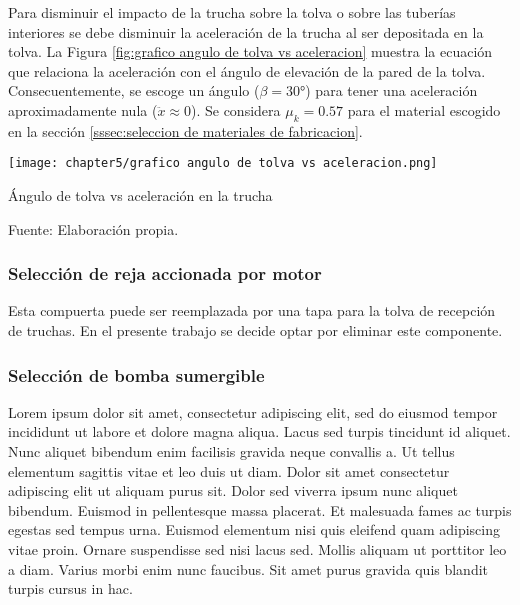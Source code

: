 Para disminuir el impacto de la trucha sobre la tolva o sobre las tuberías interiores se debe disminuir la aceleración de la trucha al ser depositada en la tolva. La Figura \ref{fig:grafico angulo de tolva vs aceleracion} muestra la ecuación que relaciona la aceleración con el ángulo de elevación de la pared de la tolva. Consecuentemente, se escoge un ángulo ($\beta=30°$) para tener una aceleración aproximadamente nula ($\ddot{x}\approx0$). Se considera $\mu_{k}=0.57$ para el material escogido en la sección \ref{sssec:seleccion de materiales de fabricacion}.


\begin{myfigure}[H]
	\centering
	\texttt{[image: chapter5/grafico angulo de tolva vs aceleracion.png]}
	\caption{Ángulo de tolva vs aceleración en la trucha}
	\begin{myflushleftportland}
		Fuente: Elaboración propia.
	\end{myflushleftportland}
	\label{fig:grafico angulo de tolva vs aceleracion}
\end{myfigure}

\subsubsection{Selección de reja accionada por motor}

Esta compuerta puede ser reemplazada por una tapa para la tolva de recepción de truchas. En el presente trabajo se decide optar por eliminar este componente.

\subsubsection{Selección de bomba sumergible}

Lorem ipsum dolor sit amet, consectetur adipiscing elit, sed do eiusmod tempor incididunt ut labore et dolore magna aliqua. Lacus sed turpis tincidunt id aliquet. Nunc aliquet bibendum enim facilisis gravida neque convallis a. Ut tellus elementum sagittis vitae et leo duis ut diam. Dolor sit amet consectetur adipiscing elit ut aliquam purus sit. Dolor sed viverra ipsum nunc aliquet bibendum. Euismod in pellentesque massa placerat. Et malesuada fames ac turpis egestas sed tempus urna. Euismod elementum nisi quis eleifend quam adipiscing vitae proin. Ornare suspendisse sed nisi lacus sed. Mollis aliquam ut porttitor leo a diam. Varius morbi enim nunc faucibus. Sit amet purus gravida quis blandit turpis cursus in hac.

